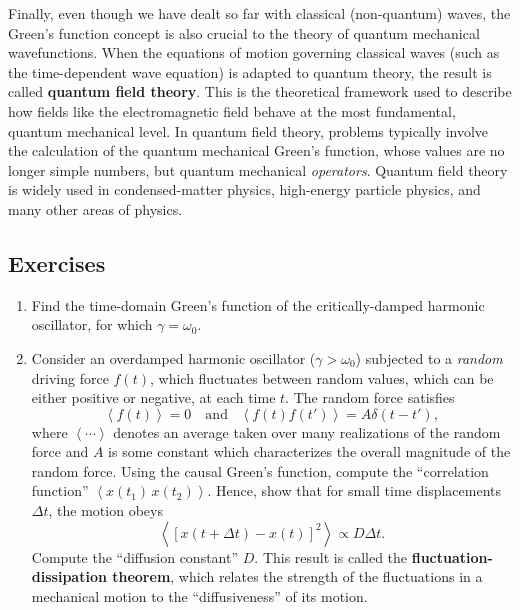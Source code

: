 \documentclass[10pt,a4paper]{article}
\begin{document}
Finally, even though we have dealt so far with classical (non-quantum)
waves, the Green's function concept is also crucial to the theory of
quantum mechanical wavefunctions. When the equations of motion governing
classical waves (such as the time-dependent wave equation) is adapted to
quantum theory, the result is called \textbf{quantum field theory}. This
is the theoretical framework used to describe how fields like the
electromagnetic field behave at the most fundamental, quantum mechanical
level. In quantum field theory, problems typically involve the
calculation of the quantum mechanical Green's function, whose values are
no longer simple numbers, but quantum mechanical \emph{operators}.
Quantum field theory is widely used in condensed-matter physics,
high-energy particle physics, and many other areas of physics.

\subsection{Exercises}\label{exercises}

\begin{enumerate}
\item 
Find the time-domain Green's function of the critically-damped harmonic
oscillator, for which $\gamma = \omega_0$.

\item
Consider an overdamped harmonic oscillator ($\gamma > \omega_0$)
subjected to a \emph{random} driving force $f(t)$, which fluctuates
between random values, which can be either positive or negative, at each
time $t$. The random force satisfies
\begin{equation}
\left\langle f(t)\right\rangle = 0 \quad\mathrm{and}\;\;\;\left\langle f(t) f(t')\right\rangle = A \delta(t-t'),
\end{equation}
where $\left\langle\cdots\right\rangle$ denotes an average taken over
many realizations of the random force and $A$ is some constant which
characterizes the overall magnitude of the random force. Using the
causal Green's function, compute the ``correlation function''
$\left\langle x(t_1)\, x(t_2) \right\rangle$. Hence, show that for
small time displacements $\Delta t$, the motion obeys
\begin{equation}
\left\langle [x(t+\Delta t) - x(t)]^2 \right\rangle \propto D \Delta t.
\end{equation}
Compute the ``diffusion constant'' $D$. This result is called the
\textbf{fluctuation-dissipation theorem}, which relates the strength of
the fluctuations in a mechanical motion to the ``diffusiveness'' of its
motion.
\end{enumerate}
\end{document}
